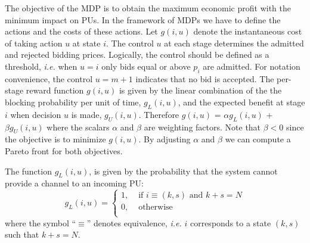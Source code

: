 The objective of the MDP is to obtain the maximum economic profit with the minimum impact on PUs. In the framework of MDPs we have to define the actions and the costs of these actions.
 Let $g(i,u)$ denote the instantaneous cost of taking action $u$ at state $i$. The control $u$ at each stage determines the admitted and rejected bidding prices. Logically, the control should be defined as a threshold, \textit{i.e.} when $u = i$ only bids equal or above $p_{i}$ are admitted. For notation convenience, the control $u = m+1$ indicates that no bid is accepted. The per-stage reward function $g(i,u)$ is given by the linear combination of the the blocking probability per unit of time, $g_{L}(i,u)$, and the expected benefit at stage $i$ when decision $u$ is made, $g_{U}(i,u)$. Therefore $g(i,u)$ =  $\alpha g_{L}(i,u)$ + $\beta g_{U}(i,u)$ where the scalars $\alpha$ and $\beta$ are weighting factors. Note that $\beta < 0$ since the objective is to minimize $g(i,u)$. By adjusting $\alpha$ and $\beta$ we can compute a Pareto front for both objectives.

The function $g_{L}(i,u)$, is given by the probability that the system cannot provide a channel to an incoming PU:
\begin{equation} \label{gLpriority}
	  g_{L}(i,u) =
	  \begin{cases}
		1,& \text{ if }i \equiv (k,s) \text{ and } k+s = N\\	 
		0,& \text{ otherwise} \\
 \end{cases}
\end{equation}
where the symbol ``$\equiv$'' denotes equivalence, \textit{i.e.} $i$ corresponds to a state $(k,s)$ such that $k+s = N$.

